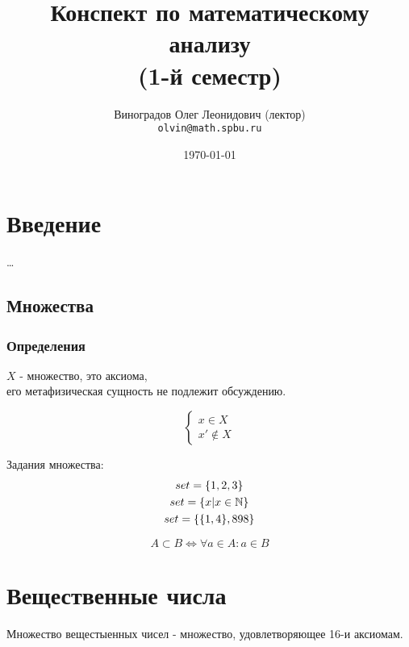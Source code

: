\documentclass[12pt, a4paper]{article}
\title{Конспект по математическому анализу \\(1-й семестр)}
\author{
  \vova
  \and
  Виноградов Олег Леонидович (лектор)\\
  \texttt{olvin@math.spbu.ru}
}
\date{\today}
\begin{document}
  \maketitle
  \newpage
  \tableofcontents
  \newpage


  \section{Введение}

  \dots

	


  \subsection{Множества}


  \subsubsection{Определения} 

  \begin{definition}[Множество]
  $X$ - множество, это аксиома, \\
  его метафизическая сущность не подлежит обсуждению.  
  \end{definition}

  \begin{equation}
  \begin{cases}
    x \in X \\
    x' \notin X
  \end{cases}
  \end{equation}

  \begin{example}
  Задания множества: 
  \begin{gather}
    set = \{1, 2, 3\} \\
    set = \{x | x \in {\mathbb{N}}\} \\
    set = \{\{1, 4\}, 898\}
  \end{gather}
  \end{example}

  \begin{definition}[Подмножество]
  \begin{equation}
    A \subset B \Longleftrightarrow \forall a \in A: a \in B
  \end{equation}
  \end{definition}

  \section{Вещественные числа}
  Множество вещестыенных чисел - множество, 
  удовлетворяющее 16-и аксиомам.
\end{document}
